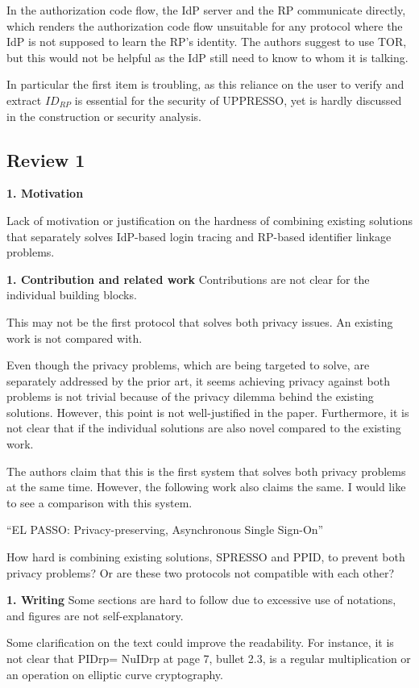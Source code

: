 \documentclass[letterpaper,onecolumn,10pt]{article}
\begin{document}
In the authorization code flow, the IdP server and the RP communicate directly, which renders the authorization code flow unsuitable for any protocol where the IdP is not supposed to learn the RP's identity. The authors suggest to use TOR, but this would not be helpful as the IdP still need to know to whom it is talking.

In particular the first item is troubling, as this reliance on the user to verify and extract $ID_{RP}$ is essential for the security of UPPRESSO, yet is hardly discussed in the construction or security analysis.



\subsection*{Review 1}
\noindent\textbf{1. Motivation}

Lack of motivation or justification on the hardness of combining existing solutions that separately solves IdP-based login tracing and RP-based identifier linkage problems.

\noindent\textbf{1. Contribution and related work}
Contributions are not clear for the individual building blocks.

This may not be the first protocol that solves both privacy issues. An existing work is not compared with.

Even though the privacy problems, which are being targeted to solve, are separately addressed by the prior art, it seems achieving privacy against both problems is not trivial because of the privacy dilemma behind the existing solutions. However, this point is not well-justified in the paper. Furthermore, it is not clear that if the individual solutions are also novel compared to the existing work.


The authors claim that this is the first system that solves both privacy problems at the same time. However, the following work also claims the same. I would like to see a comparison with this system.

``EL PASSO: Privacy-preserving, Asynchronous Single Sign-On''


How hard is combining existing solutions, SPRESSO and PPID, to prevent both privacy problems? Or are these two protocols not compatible with each other?

\noindent\textbf{1. Writing}
Some sections are hard to follow due to excessive use of notations, and figures are not self-explanatory. 

Some clarification on the text could improve the readability. For instance, it is not clear that PIDrp= NuIDrp at page 7, bullet 2.3, is a regular multiplication or an operation on elliptic curve cryptography.
\end{document}
